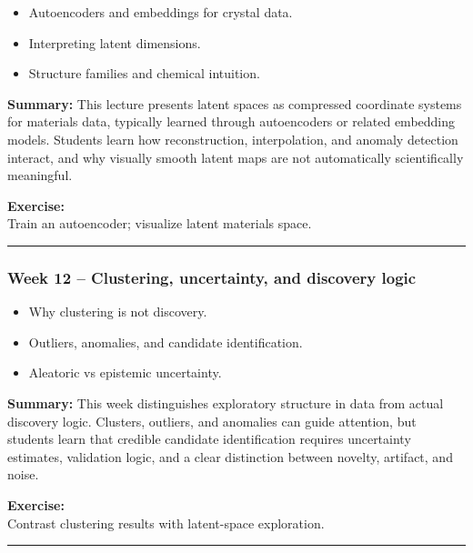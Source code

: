 \documentclass[
]{agujournal2019}
\providecommand{\tightlist}{%
  \setlength{\itemsep}{0pt}\setlength{\parskip}{0pt}}
\begin{document}
\begin{itemize}
\tightlist
\item
  Autoencoders and embeddings for crystal data.
\item
  Interpreting latent dimensions.
\item
  Structure families and chemical intuition.
\end{itemize}

\textbf{Summary:} This lecture presents latent spaces as compressed
coordinate systems for materials data, typically learned through
autoencoders or related embedding models. Students learn how
reconstruction, interpolation, and anomaly detection interact, and why
visually smooth latent maps are not automatically scientifically
meaningful.

\textbf{Exercise:}\\
Train an autoencoder; visualize latent materials space.

\begin{center}\rule{0.5\linewidth}{0.5pt}\end{center}

\subsubsection{Week 12 -- Clustering, uncertainty, and discovery
logic}\label{week-12-clustering-uncertainty-and-discovery-logic}

\begin{itemize}
\tightlist
\item
  Why clustering is not discovery.
\item
  Outliers, anomalies, and candidate identification.
\item
  Aleatoric vs epistemic uncertainty.
\end{itemize}

\textbf{Summary:} This week distinguishes exploratory structure in data
from actual discovery logic. Clusters, outliers, and anomalies can guide
attention, but students learn that credible candidate identification
requires uncertainty estimates, validation logic, and a clear
distinction between novelty, artifact, and noise.

\textbf{Exercise:}\\
Contrast clustering results with latent-space exploration.

\begin{center}\rule{0.5\linewidth}{0.5pt}\end{center}
\end{document}
